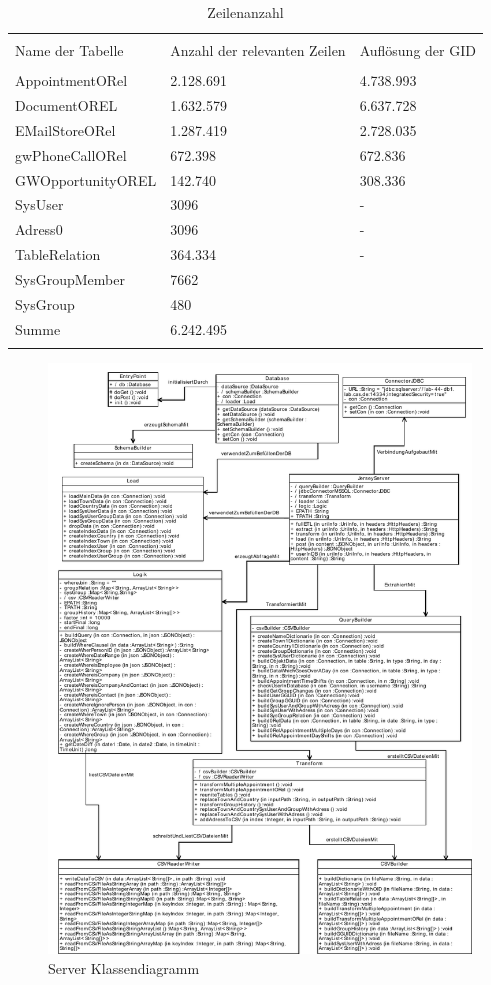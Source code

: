 \begin{table}[htbp]
\centering
\label{tb_zeilenanzahl}
\begin{tabularx}{\textwidth} {X X X}
& & \\
Name der Tabelle &  Anzahl der relevanten Zeilen & Auflösung der GID\\
& & \\
AppointmentORel & 2.128.691 & 4.738.993 \\
DocumentOREL & 1.632.579 & 6.637.728 \\
EMailStoreORel & 1.287.419 & 2.728.035 \\
gwPhoneCallORel & 672.398 & 672.836 \\
GWOpportunityOREL & 142.740 & 308.336 \\
SysUser & 3096 & - \\
Adress0 & 3096 & - \\
TableRelation & 364.334 & - \\
SysGroupMember & 7662 & \\
SysGroup & 480 & \\
\midrule
Summe & 6.242.495 \\
& & \\
\end{tabularx}
\caption{Zeilenanzahl}
\end{table}

\begin{figure}[htbp]
\begin{center}
\includegraphics[width=1.0\textwidth]{pics/ServerKlassendiagramm.pdf}
\caption{Server Klassendiagramm}
\label{umsetzung_klassendiagramm_server}
\end{center}
\end{figure}